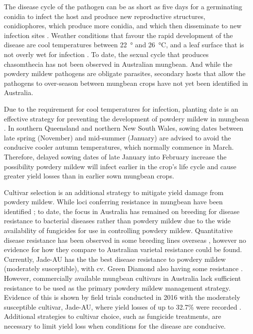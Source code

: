 \documentclass[agronomy,article,submit,moreauthors,pdftex]{mdpi}
\begin{document}
The disease cycle of the pathogen can be as short as five days for a germinating conidia to infect the host and produce new reproductive structures, conidiophores, which produce more conidia, and which then disseminate to new infection sites \citep{PerezGarcia2009, Sparks2017}.
Weather conditions that favour the rapid development of the disease are cool temperatures between 22~° and 26~°C, and a leaf surface that is not overly wet for infection \citep{Kelly2017a}.
To date, the sexual cycle that produces chasomthecia has not been observed in Australian mungbean.
And while the powdery mildew pathogens are obligate parasites, secondary hosts that allow the pathogens to over-season between mungbean crops have not yet been identified in Australia.

Due to the requirement for cool temperatures for infection, planting date is an effective strategy for preventing the development of powdery mildew in mungbean \citep{AMAplanting}.
In southern Queensland and northern New South Wales, sowing dates between late spring (November) and mid-summer (January) are advised to avoid the conducive cooler autumn temperatures, which normally commence in March.
Therefore, delayed sowing dates of late January into February increase the possibility powdery mildew will infect earlier in the crop's life cycle and cause greater yield losses than in earlier sown mungbean crops.

Cultivar selection is an additional strategy to mitigate yield damage from powdery mildew.
While loci conferring resistance in mungbean have been identified \citep{Humphry2003, Zhang2008}; to date, the focus in Australia has remained on breeding for disease resistance to bacterial diseases rather than powdery mildew due to the wide availability of fungicides for use in controlling powdery mildew.
Quantitative disease resistance has been observed in some breeding lines overseas \citep{Pandey2018, Chankaew2013}, however no evidence for how they compare to Australian varietal resistance could be found.
Currently, Jade-AU has the the best disease resistance to powdery mildew (moderately susceptible), with cv. Green Diamond also having some resistance \citep{AMAGuide}.
However, commercially available mungbean cultivars in Australia lack sufficient resistance to be used as the primary powdery mildew management strategy.
Evidence of this is shown by field trials conducted in 2016 with the moderately susceptible cultivar, Jade-AU, where yield losses of up to 32.7\% were recorded \citep{SueThompson2016}.
Additional strategies to cultivar choice, such as fungicide treatments, are necessary to limit yield loss when conditions for the disease are conducive.
\end{document}
